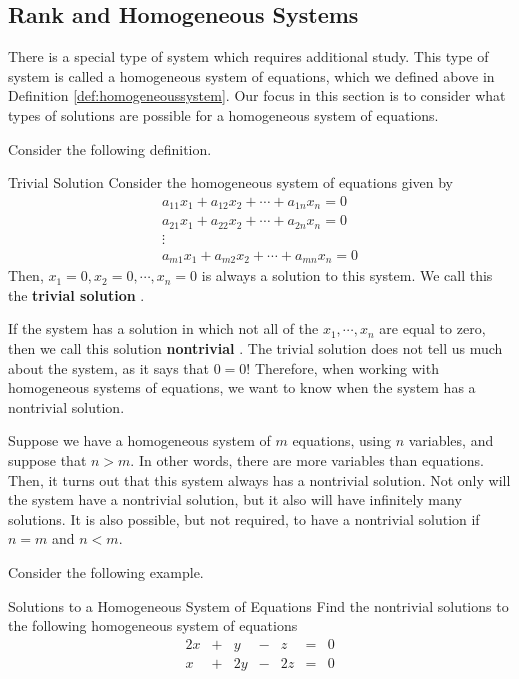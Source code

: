 \subsection{Rank and Homogeneous Systems}

There is a special type of system which requires additional study. This type of system is called a homogeneous system of
equations, which we defined above in Definition \ref{def:homogeneoussystem}. 
Our focus in this section is to consider what types of solutions are possible for a homogeneous system of equations. 

Consider the following definition. 

\begin{definition}{Trivial Solution}\label{def:trivialsolution}
Consider the homogeneous system of equations given by
\begin{equation*}
\begin{array}{c}
a_{11}x_{1}+a_{12}x_{2}+\cdots +a_{1n}x_{n}= 0 \\
a_{21}x_{1}+a_{22}x_{2}+\cdots +a_{2n}x_{n}= 0  \\
\vdots \\
a_{m1}x_{1}+a_{m2}x_{2}+\cdots +a_{mn}x_{n}= 0 
\end{array}
\end{equation*}
Then, $x_{1} = 0, x_{2} = 0, \cdots, x_{n} =0$ is always a 
solution to this system. We call this the \textbf{trivial solution} .
\end{definition}

If the system has a solution in which not all of the $x_1, \cdots, x_n$ are equal to zero,
then we call this solution \textbf{nontrivial} . The trivial solution
does not tell us much about the system, as it says that $0=0$! 
Therefore, when working with homogeneous systems of 
equations, we want to know when the system has a nontrivial solution. 

Suppose we have a homogeneous system of $m$ equations, using $n$ variables, and suppose that
$n > m$. In other words, there are more variables than equations. 
Then, it turns out that this system always has a nontrivial solution. Not only will the
system have a nontrivial solution, but it also will have infinitely many solutions.
It is also possible, but not required, to have a nontrivial solution if $n=m$ and $n<m$.

Consider the following example.

\begin{example}{Solutions to a Homogeneous System of Equations}\label{exa:homogeneoussolution}
Find the nontrivial solutions to the following homogeneous system of equations
\begin{equation*}
\begin{array}{cccccccc}
2x &+& y &-& z &=& 0 \\
x &+& 2y &-& 2z &=& 0
\end{array}
\end{equation*}
\end{example}

